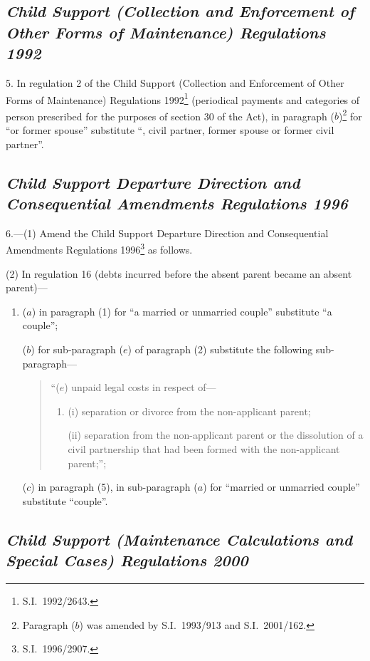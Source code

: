 \documentclass[12pt,a4paper]{article}
\begin{document}
\subsection*{\itshape Child Support (Collection and Enforcement of Other Forms of Maintenance) Regulations 1992}

5.  In regulation 2 of the Child Support (Collection and Enforcement of Other Forms of Maintenance) Regulations 1992\footnote{S.I.\ 1992/2643.} (periodical payments and categories of person prescribed for the purposes of section 30 of the Act), in paragraph ($b$)\footnote{Paragraph ($b$) was amended by S.I.\ 1993/913 and S.I.\ 2001/162.} for “or former spouse” substitute “, civil partner, former spouse or former civil partner”.

\subsection*{\itshape\sloppy Child Support Departure Direction and Consequential Amendments Regulations 1996}

6.---(1)  Amend the Child Support Departure Direction and Consequential Amendments Regulations 1996\footnote{S.I.\ 1996/2907.} as follows.

(2) In regulation 16 (debts incurred before the absent parent became an absent parent)—
\begin{enumerate}\item[]
($a$) in paragraph (1) for “a married or unmarried couple” substitute “a couple”;

($b$) for sub-paragraph ($e$)  of paragraph (2) substitute the following sub-paragraph—
\begin{quotation}
“($e$) unpaid legal costs in respect of—
\begin{enumerate}\item[]
(i) separation or divorce from the non-applicant parent;

(ii) separation from the non-applicant parent or the dissolution of a civil partnership that had been formed with the non-applicant parent;”;
\end{enumerate}
\end{quotation}

($c$) in paragraph (5), in sub-paragraph ($a$)  for “married or unmarried couple” substitute “couple”.
\end{enumerate}

\subsection*{\itshape Child Support (Maintenance Calculations and Special Cases) Regulations 2000}
\end{document}
